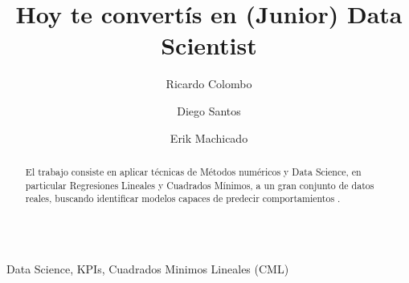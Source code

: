 \documentclass{endm}
\begin{document}
\begin{verbatim}\end{verbatim}\vspace{2.5cm}

\begin{frontmatter}

\title{Hoy te convert\'is en (Junior) Data Scientist}

\author{Ricardo Colombo}
\author{Diego Santos}
\author{Erik Machicado}
\address{Departamento de Computaci\'on\\ Universidad de Buenos Aires\\ C.A.B.A, Argentina}



\begin{abstract}
El trabajo consiste en aplicar t\'ecnicas de M\'etodos num\'ericos y 
Data Science, en particular Regresiones Lineales y Cuadrados M\'inimos, 
a un gran conjunto de datos reales, buscando identificar modelos 
capaces de predecir comportamientos .
\end{abstract}

\begin{keyword}
Data Science, KPIs, Cuadrados Minimos Lineales (CML)
\end{keyword}

\end{frontmatter}
\end{document}
